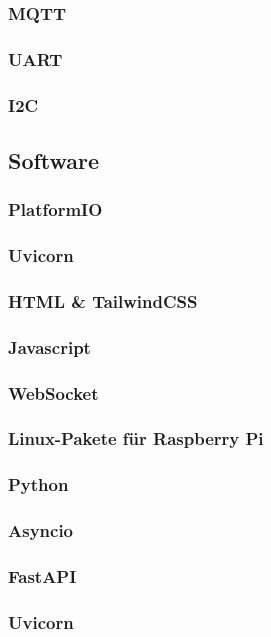 \documentclass[12pt, letterpaper]{article}
\begin{document}
  \subsubsection{MQTT}
  \subsubsection{UART}
  \subsubsection{I2C}
    
  \subsection{Software}
  \subsubsection{PlatformIO}

    \subsubsection{Uvicorn}
    \subsubsection{HTML \& TailwindCSS}
    \subsubsection{Javascript}
    \subsubsection{WebSocket}
    \subsubsection{Linux-Pakete für Raspberry Pi}
    \subsubsection{Python}
    \subsubsection{Asyncio}
    \subsubsection{FastAPI}
    \subsubsection{Uvicorn}
\end{document}
